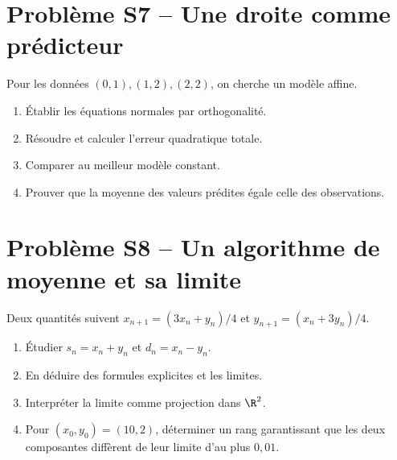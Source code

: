 \section*{Problème S7 -- Une droite comme prédicteur}

Pour les données $(0,1),(1,2),(2,2)$, on cherche un modèle affine.
\begin{enumerate}
\item Établir les équations normales par orthogonalité.
\item Résoudre et calculer l'erreur quadratique totale.
\item Comparer au meilleur modèle constant.
\item Prouver que la moyenne des valeurs prédites égale celle des observations.
\end{enumerate}

\section*{Problème S8 -- Un algorithme de moyenne et sa limite}

Deux quantités suivent
$x_{n+1}=(3x_n+y_n)/4$ et $y_{n+1}=(x_n+3y_n)/4$.
\begin{enumerate}
\item Étudier $s_n=x_n+y_n$ et $d_n=x_n-y_n$.
\item En déduire des formules explicites et les limites.
\item Interpréter la limite comme projection dans $\R^2$.
\item Pour $(x_0,y_0)=(10,2)$, déterminer un rang garantissant que les
deux composantes diffèrent de leur limite d'au plus $0{,}01$.
\end{enumerate}
